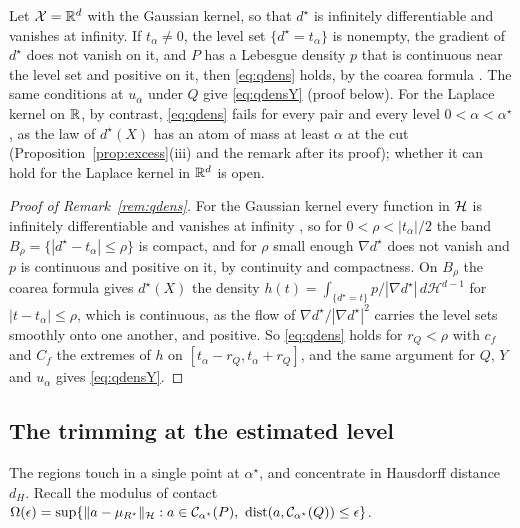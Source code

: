 \begin{remark}
\label{rem:qdens}
Let $\mathcal X=\mathbb{R}^d$ with the Gaussian kernel, so that $d^\star$ is infinitely differentiable and vanishes at
infinity. If $t_\alpha\neq0$, the level set $\{d^\star=t_\alpha\}$ is nonempty, the gradient of $d^\star$ does not
vanish on it, and $P$ has a Lebesgue density $p$ that is continuous near the level set and positive on it, then
\eqref{eq:qdens} holds, by the coarea formula \citep{evans2015measure}. The same conditions at $u_\alpha$ under $Q$
give \eqref{eq:qdensY} (proof below). For the Laplace kernel on $\mathbb{R}$, by contrast, \eqref{eq:qdens} fails for every
pair and every level $0<\alpha<\alpha^\star$, as the law of $d^\star(X)$ has an atom of mass at least $\alpha$ at the
cut (Proposition~\ref{prop:excess}(iii) and the remark after its proof); whether it can hold for the Laplace kernel in
$\mathbb{R}^d$ is open.
\end{remark}

\begin{proof}[Proof of Remark~\ref{rem:qdens}]
For the Gaussian kernel every function in $\mathcal{H}$ is infinitely differentiable \citep[Corollary~4.36]{steinwart2008svm}
and vanishes at infinity \citep[Theorem~4.21 and Lemma~4.23]{steinwart2008svm}, so for $0<\rho<|t_\alpha|/2$ the band
$B_\rho=\{|d^\star-t_\alpha|\le\rho\}$ is compact, and for $\rho$ small enough $\nabla d^\star$ does not vanish and $p$ is
continuous and positive on it, by continuity and compactness. On $B_\rho$ the coarea formula \citep{evans2015measure}
gives $d^\star(X)$ the density $h(t)=\int_{\{d^\star=t\}}p/|\nabla d^\star|\,d\mathcal H^{d-1}$ for $|t-t_\alpha|\le\rho$,
which is continuous, as the flow of $\nabla d^\star/|\nabla d^\star|^2$ carries the level sets smoothly onto one another,
and positive. So \eqref{eq:qdens} holds for $r_Q<\rho$ with $c_f$ and $C_f$ the extremes of $h$ on
$[t_\alpha-r_Q,t_\alpha+r_Q]$, and the same argument for $Q$, $Y$ and $u_\alpha$ gives \eqref{eq:qdensY}.
\end{proof}

\subsection{The trimming at the estimated level}

The regions touch in a single point at $\alpha^\star$, and concentrate in Hausdorff distance $d_H$. Recall the modulus
of contact $\Omega(\epsilon)=\sup\{\|a-\mu_{R^\star}\|_{\mathcal{H}}:a\in\mathcal C_{\alpha^\star}(P),\
\operatorname{dist}(a,\mathcal C_{\alpha^\star}(Q))\le\epsilon\}$.


